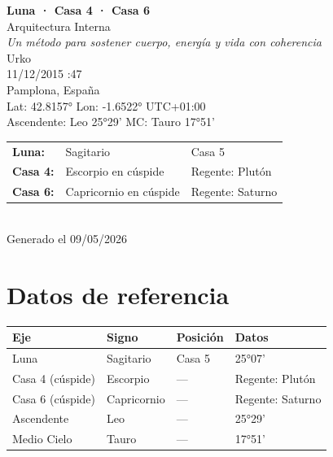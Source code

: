 \documentclass[11pt,a4paper]{article}
\begin{document}
\begin{titlepage}
  \centering
  \vspace*{1.5cm}
  {\Huge\bfseries\color{azulai} Luna · Casa 4 · Casa 6}\\[0.5cm]
  {\large\color{grisai} Arquitectura Interna}\\[0.3cm]
  {\small\itshape\color{grisai} Un método para sostener cuerpo, energía y vida con coherencia}\\[2cm]
  {\huge\color{doradoai} Urko}\\[1.5cm]
  {\Large 11/12/2015 :47}\\[0.3cm]
  {\Large Pamplona, España}\\[0.3cm]
  {\normalsize Lat: 42.8157° \quad Lon: -1.6522° \quad UTC+01:00}\\[0.3cm]
  {\normalsize Ascendente: Leo 25°29' \quad
    MC: Tauro 17°51'}\\[2cm]

  \begin{tabular}{lll}
    \textbf{Luna:} & Sagitario & Casa 5 \\
    \textbf{Casa 4:} & Escorpio en cúspide & Regente: Plutón \\
    \textbf{Casa 6:} & Capricornio en cúspide & Regente: Saturno \\
  \end{tabular}\\[2cm]

  \vfill
  {\small Generado el 09/05/2026}
\end{titlepage}

\tableofcontents
\clearpage

\section{Datos de referencia}

\begin{center}
\begin{tabular}{llll}
  \toprule
  \textbf{Eje} & \textbf{Signo} & \textbf{Posición} & \textbf{Datos} \\
  \midrule
  Luna & Sagitario & Casa 5 & 25°07' \\
  Casa 4 (cúspide) & Escorpio & --- & Regente: Plutón \\
  Casa 6 (cúspide) & Capricornio & --- & Regente: Saturno \\
  Ascendente & Leo & --- & 25°29' \\
  Medio Cielo & Tauro & --- & 17°51' \\
  \bottomrule
\end{tabular}
\end{center}
\end{document}
